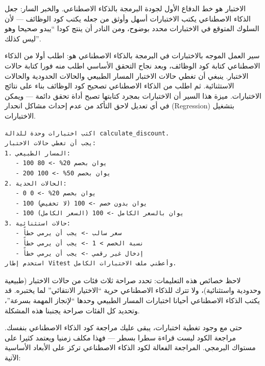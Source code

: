 


الاختبار هو خط الدفاع الأول لجودة البرمجة بالذكاء الاصطناعي. والخبر السار: جعل الذكاء الاصطناعي يكتب الاختبارات أسهل وأوثق من جعله يكتب كود الوظائف — لأن السلوك المتوقع في الاختبارات محدد بوضوح، ومن النادر أن ينتج كودا “يبدو صحيحا وهو ليس كذلك”.

سير العمل الموجه بالاختبارات في البرمجة بالذكاء الاصطناعي هو: اطلب أولا من الذكاء الاصطناعي كتابة كود الوظائف، وبعد نجاح التحقق الأساسي اطلب منه فورا كتابة حالات الاختبار. ينبغي أن تغطي حالات الاختبار المسار الطبيعي والحالات الحدودية والحالات الاستثنائية. ثم اطلب من الذكاء الاصطناعي تصحيح كود الوظائف بناء على نتائج الاختبارات. ميزة هذا السير أن الاختبارات بمجرد كتابتها تصبح أداة تحقق دائمة — ويمكن في أي تعديل لاحق التأكد من عدم إحداث مشاكل انحدار (Regression) بتشغيل الاختبارات.

\begin{lstlisting}
اكتب اختبارات وحدة للدالة calculate_discount.
يجب أن تغطي حالات الاختبار:
1. المسار الطبيعي:
   - 100 يوان بخصم 20% -> 80
   - 200 يوان بخصم 50% -> 100
2. الحالات الحدية:
   - 0 يوان بخصم 20% -> 0
   - 100 يوان بدون خصم -> 100 (لا تخفيض)
   - 100 يوان بالسعر الكامل -> 100 (السعر الكامل)
3. حالات استثنائية:
   - سعر سالب -> يجب أن يرمي خطأً
   - نسبة الخصم > 1 -> يجب أن يرمي خطأً
   - إدخال غير رقمي -> يجب أن يرمي خطأً
استخدم إطار Vitest وأعطني ملف الاختبارات الكامل.
\end{lstlisting}

لاحظ خصائص هذه التعليمات: تحدد صراحة ثلاث فئات من حالات الاختبار (طبيعية وحدودية واستثنائية)، ولا تترك للذكاء الاصطناعي حرية “الاختيار الانتقائي” لما يختبره. قد يكتب الذكاء الاصطناعي أحيانا اختبارات المسار الطبيعي وحدها “لإنجاز المهمة بسرعة”، وتحديد كل الفئات صراحة يجنبنا هذه المشكلة.


حتى مع وجود تغطية اختبارات، يبقى عليك مراجعة كود الذكاء الاصطناعي بنفسك. مراجعة الكود ليست قراءة سطرا بسطر — فهذا مكلف زمنيا ويعتمد كثيرا على مستواك البرمجي. المراجعة الفعالة لكود الذكاء الاصطناعي تركز على الأبعاد الأساسية الآتية:

